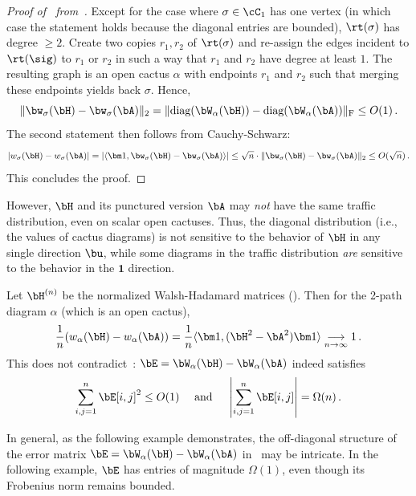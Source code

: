 \begin{proof}[Proof of~ from~]
    Except for the case where $\sigma \in \cC_1$ has one vertex (in which case the statement holds because the diagonal entries are bounded), $\rt(\sigma)$ has degree $\ge 2$. Create
    two copies $r_1,r_2$ of $\rt(\sigma)$ and re-assign the edges
    incident to $\rt(\sig)$ to $r_1$ or $r_2$ in such a way that $r_1$ and $r_2$
    have degree at least $1$. The resulting
    graph is an open cactus $\alpha$ with endpoints $r_1$ and $r_2$ such that merging
    these endpoints yields back $\sigma$.
    Hence,
    \[
        \|\bw_\sigma(\bH) - \bw_\sigma(\bA)\|_2 = \|\textnormal{diag}(\bW_\alpha(\bH)) - \textnormal{diag}(\bW_\alpha(\bA))\|_{\textnormal F}\le O(1)\,.
    \]
    The second statement then follows from Cauchy-Schwarz:
    \[
        |w_\sigma(\bH)-w_\sigma(\bA)| = |\langle \bm 1, \bw_\sigma(\bH)-\bw_\sigma(\bA)\rangle| \le \sqrt n \cdot  \|\bw_\sigma(\bH) - \bw_\sigma(\bA)\|_2\le O(\sqrt n)\,.
    \]
    This concludes the proof.
\end{proof}

However, $\bH$ and its punctured version $\bA$ may  
{\em not} have the same traffic distribution, even on scalar open
cactuses.
Thus, the diagonal distribution (i.e., the values of cactus diagrams) is not sensitive to the behavior of $\bH$ in any single direction $\bu$, while some diagrams in the traffic distribution \emph{are} sensitive to the behavior in the $\bm 1$ direction.

\begin{example}\label{ex:puncture-hadamard}
    Let $\bH^{(n)}$ be the normalized
    Walsh-Hadamard matrices (). Then for the 2-path diagram $\alpha$ (which is an open cactus),
    \[
        \frac 1n (w_\alpha(\bH) - w_\alpha(\bA)) = \frac 1n \langle \bm 1, (\bH^2 - \bA^2) \bm 1\rangle  \underset{n\to\infty}{\longrightarrow} 1\,.
    \]
    This does not contradict~: $\bE = \bW_\alpha(\bH) - \bW_\alpha(\bA)$ indeed satisfies
    \[
        \sum_{i,j=1}^n \bE[i,j]^2 \le O(1)\quad \text{ and }\quad \left|\sum_{i,j=1}^n \bE[i,j] \right| = \Omega(n)\,.
    \]

\end{example}

In general, as the following example demonstrates, the off-diagonal structure of the error matrix
$\bE = \bW_\alpha(\bH) - \bW_\alpha(\bA)$ in~ may
be intricate. 
In the following example, $\bE$ has
entries of magnitude $\Omega(1)$, even though its
Frobenius norm remains bounded.

